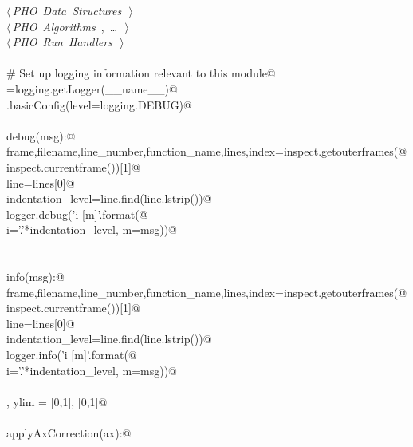 \documentclass[12.0pt]{report}
\begin{document}
\begin{appendices}
\begin{flushleft}
\begin{list}{}{}
\mbox{}\verb@@\hbox{$\langle\,${\itshape PHO Data Structures}\nobreak\ {\footnotesize {}}$\,\rangle$}\verb@@\\
\mbox{}\verb@@\hbox{$\langle\,${\itshape PHO Algorithms}\nobreak\ {\footnotesize {}, \ldots\ }$\,\rangle$}\verb@@\\
\mbox{}\verb@@\hbox{$\langle\,${\itshape PHO Run Handlers}\nobreak\ {\footnotesize {}}$\,\rangle$}\verb@@\\
\mbox{}\verb@@\\
\mbox{}\verb@# Set up logging information relevant to this module@\\
\mbox{}\verb@logger=logging.getLogger(__name__)@\\
\mbox{}\verb@logging.basicConfig(level=logging.DEBUG)@\\
\mbox{}\verb@@\\
\mbox{}\verb@def debug(msg):@\\
\mbox{}\verb@    frame,filename,line_number,function_name,lines,index=inspect.getouterframes(@\\
\mbox{}\verb@        inspect.currentframe())[1]@\\
\mbox{}\verb@    line=lines[0]@\\
\mbox{}\verb@    indentation_level=line.find(line.lstrip())@\\
\mbox{}\verb@    logger.debug('{i} [{m}]'.format(@\\
\mbox{}\verb@        i='.'*indentation_level, m=msg))@\\
\mbox{}\verb@@\\
\mbox{}\verb@@\\
\mbox{}\verb@def info(msg):@\\
\mbox{}\verb@    frame,filename,line_number,function_name,lines,index=inspect.getouterframes(@\\
\mbox{}\verb@        inspect.currentframe())[1]@\\
\mbox{}\verb@    line=lines[0]@\\
\mbox{}\verb@    indentation_level=line.find(line.lstrip())@\\
\mbox{}\verb@    logger.info('{i} [{m}]'.format(@\\
\mbox{}\verb@        i='.'*indentation_level, m=msg))@\\
\mbox{}\verb@@\\
\mbox{}\verb@xlim, ylim = [0,1], [0,1]@\\
\mbox{}\verb@@\\
\mbox{}\verb@def applyAxCorrection(ax):@\\

\end{list}
\end{flushleft}
\end{appendices}
\end{document}
